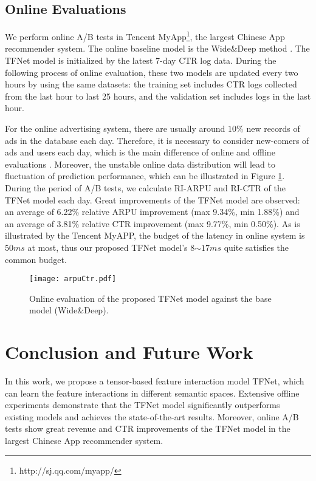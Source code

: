 \documentclass[sigconf]{acmart}
\begin{document}
\subsection{Online Evaluations}
We perform online A/B tests in Tencent MyApp\footnote{http://sj.qq.com/myapp/}, the largest Chinese App recommender system. The online baseline model is the Wide\&Deep method \cite{cheng2016wide}. The TFNet model is initialized by the latest 7-day CTR log data. During the following process of online evaluation, these two models are updated every two hours by using the same datasets: the training set includes CTR logs collected from the last hour to last 25 hours, and the validation set includes logs in the last hour.

For the online advertising system, there are usually around $10\%$  new records of ads in the database each day. Therefore, it is necessary to consider new-comers of ads and users each day, which is the main difference of online and offline evaluations \cite{chan2018convolutional}. Moreover, the unstable online data distribution will lead to fluctuation of prediction performance, which can be illustrated in Figure \ref{online}. During the period of A/B tests, we calculate RI-ARPU and RI-CTR of the TFNet model each day. Great improvements of the TFNet model are observed: an average of 6.22\% relative ARPU improvement (max 9.34\%, min 1.88\%) and an average of 3.81\% relative CTR improvement (max 9.77\%, min 0.50\%). As is illustrated by the Tencent MyAPP, the budget of the latency in online system is $50ms$ at most, thus our proposed TFNet model's $8$$\sim$$17ms$ quite satisfies the common budget.

\begin{figure}[t]
\setlength{\abovecaptionskip}{0pt}  \setlength{\belowcaptionskip}{0pt}  \centering
\small
\texttt{[image: arpuCtr.pdf]}
\caption{Online evaluation of the proposed TFNet model against the base model (Wide\&Deep). }
\label{online}
\end{figure}

\section{Conclusion and Future Work}
In this work, we propose a tensor-based feature interaction model TFNet, which can learn the feature interactions in different semantic spaces. Extensive offline experiments demonstrate that the TFNet model significantly outperforms existing models and achieves the state-of-the-art results. Moreover, online A/B tests show great revenue and CTR improvements of the TFNet model in the largest Chinese App recommender system.
\end{document}
